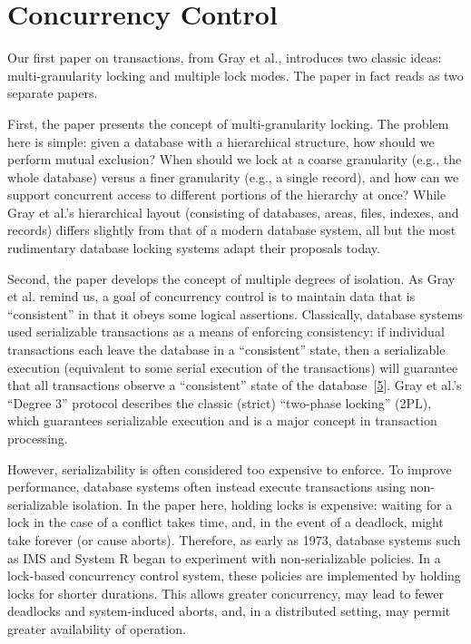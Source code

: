 \documentclass[b5paper,11pt,twoside,openright]{book}
\newcommand\Section[2]{
  \hypertarget{#1}{
    \section{#2}\label{#1}
  }
}
\begin{document}
\Section{concurrency-control}{%
Concurrency Control
}

Our first paper on transactions, from Gray et al., introduces two
classic ideas: multi-granularity locking and multiple lock modes. The
paper in fact reads as two separate papers.

First, the paper presents the concept of multi-granularity locking. The
problem here is simple: given a database with a hierarchical structure,
how should we perform mutual exclusion? When should we lock at a coarse
granularity (e.g., the whole database) versus a finer granularity (e.g.,
a single record), and how can we support concurrent access to different
portions of the hierarchy at once? While Gray et al.'s hierarchical
layout (consisting of databases, areas, files, indexes, and records)
differs slightly from that of a modern database system, all but the most
rudimentary database locking systems adapt their proposals today.

Second, the paper develops the concept of multiple degrees of isolation.
As Gray et al. remind us, a goal of concurrency control is to maintain
data that is ``consistent'' in that it obeys some logical assertions.
Classically, database systems used serializable transactions as a means
of enforcing consistency: if individual transactions each leave the
database in a ``consistent'' state, then a serializable execution
(equivalent to some serial execution of the transactions) will guarantee
that all transactions observe a ``consistent'' state of the
database~{{[}\protect\hyperlink{ref-eswaran76}{5}{]}}. Gray et al.'s
``Degree 3'' protocol describes the classic (strict) ``two-phase
locking'' (2PL), which guarantees serializable execution and is a major
concept in transaction processing.

However, serializability is often considered too expensive to enforce.
To improve performance, database systems often instead execute
transactions using non-serializable isolation. In the paper here,
holding locks is expensive: waiting for a lock in the case of a conflict
takes time, and, in the event of a deadlock, might take forever (or
cause aborts). Therefore, as early as 1973, database systems such as IMS
and System R began to experiment with non-serializable policies. In a
lock-based concurrency control system, these policies are implemented by
holding locks for shorter durations. This allows greater concurrency,
may lead to fewer deadlocks and system-induced aborts, and, in a
distributed setting, may permit greater availability of operation.
\end{document}
